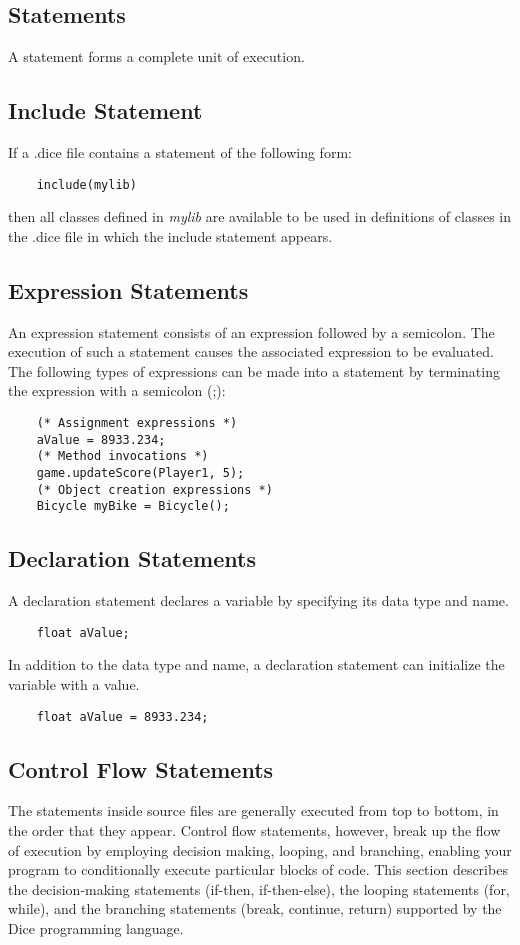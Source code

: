 \begin{homeworkProblem}
	\chapter{Statements}
	A statement forms a complete unit of execution. 
	
	\section{Include Statement}
	If a .dice file contains a statement of the following form:
	\begin{verbatim}
	include(mylib)
	\end{verbatim}
	then all classes defined in \textit{mylib} are available to be used in definitions of classes in 
	the .dice file in which the include statement appears.	

	\section{Expression Statements}
	An expression statement consists of an expression followed by a semicolon. The execution of such a statement causes the associated expression to be evaluated. The following types of expressions can be made into a statement by terminating the expression with a semicolon (;):
	\begin{verbatim}
	(* Assignment expressions *)
	aValue = 8933.234;
	(* Method invocations *)
	game.updateScore(Player1, 5);
	(* Object creation expressions *)
	Bicycle myBike = Bicycle();
	\end{verbatim}
	
	\section{Declaration Statements}
	A declaration statement declares a variable by specifying its data type and name.
	\begin{verbatim}
	float aValue;
	\end{verbatim}

	In addition to the data type and name, a declaration statement can initialize the variable with a value.
	\begin{verbatim} 
	float aValue = 8933.234;
	\end{verbatim}
	
	\section{Control Flow Statements}
	The statements inside source files are generally executed from top to bottom, in the order that they appear. Control flow statements, however, break up the flow of execution by employing decision making, looping, and branching, enabling your program to conditionally execute particular blocks of code. This section describes the decision-making statements (if-then, if-then-else), the looping statements (for, while), and the branching statements (break, continue, return) supported by the Dice programming language.


\end{homeworkProblem}
